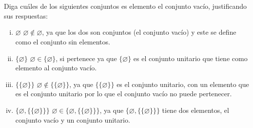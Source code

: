 \section{}
Diga cuáles de los siguientes conjuntos es elemento el conjunto vacío, justificando sus respuestas:
\begin{enumerate}[(i)]
\item $\varnothing$ \newline
$\varnothing \notin \varnothing$, ya que los dos son conjuntos (el conjunto vacío) y este se define como el conjunto sin elementos.
\item $\{\varnothing\}$\newline
$ \varnothing \in \{\varnothing\}$, si pertenece ya que $\{\varnothing\}$ es el conjunto unitario que tiene como elemento al conjunto vacío.
\item $\{\{ \varnothing\}\}$\newline  
$ \varnothing \notin \{\{ \varnothing\}\}$, ya que $\{\{ \varnothing\}\}$ es el conjunto unitario, con un elemento que es el conjunto unitario por lo que el conjunto vacío no puede pertenecer.
\item $\{\varnothing, \{\{ \varnothing\}\} \}$  \newline
$  \varnothing \in \{\varnothing, \{\{ \varnothing\}\} \}$, ya que $\{\varnothing, \{\{ \varnothing\}\} \}$ tiene dos elementos, el conjunto vacío y un conjunto unitario.
\end{enumerate}